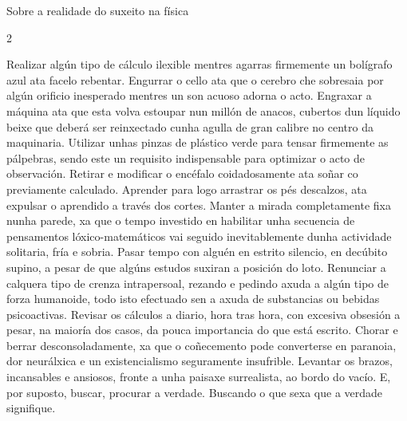 \Artigo*%
{miscelanea}%
{Sobre a realidade do suxeito na física}%
{}%
{}%

\vspace*{3mm}


\begin{multicols}{2}

Realizar algún tipo de cálculo ilexible mentres agarras firmemente un bolígrafo
azul ata facelo rebentar. Engurrar o cello ata que o cerebro che sobresaia por
algún orificio inesperado mentres un son acuoso adorna o acto. Engraxar a
máquina ata que esta volva estoupar nun millón de anacos, cubertos dun líquido
beixe que deberá ser reinxectado cunha agulla de gran calibre no centro da
maquinaria. Utilizar unhas pinzas de plástico verde para tensar firmemente as
pálpebras, sendo este un requisito indispensable para optimizar o acto de
observación. Retirar e modificar o encéfalo coidadosamente ata soñar co
previamente calculado. Aprender para logo arrastrar os pés descalzos, ata
expulsar o aprendido a través dos cortes. Manter a mirada completamente fixa
nunha parede, xa que o tempo investido en habilitar unha secuencia de
pensamentos lóxico-matemáticos vai seguido inevitablemente dunha actividade
solitaria, fría e sobria. Pasar tempo con alguén en estrito silencio, en
decúbito supino, a pesar de que algúns estudos suxiran a posición do loto.
Renunciar a calquera tipo de crenza intrapersoal, rezando e pedindo axuda a
algún tipo de forza humanoide, todo isto efectuado sen a axuda de substancias
ou bebidas psicoactivas. Revisar os cálculos a diario, hora tras hora, con
excesiva obsesión a pesar, na maioría dos casos, da pouca importancia do que
está escrito. Chorar e berrar desconsoladamente, xa que o coñecemento pode
converterse en paranoia, dor neurálxica e un existencialismo seguramente
insufrible. Levantar os brazos, incansables e ansiosos, fronte a unha paisaxe
surrealista, ao bordo do vacío. E, por suposto, buscar, procurar a verdade.
Buscando o que sexa que a verdade signifique.

\end{multicols}

\vspace*{3mm}


